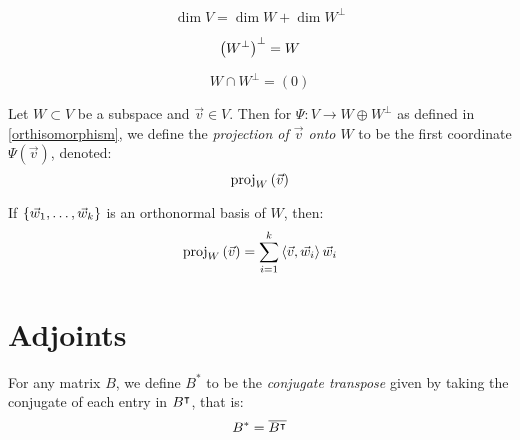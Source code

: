 \begin{corollary}
  $$\dim V = \dim W + \dim W^\perp$$
\end{corollary}

\begin{corollary}
  $$\paren{W^\perp}^\perp = W$$
\end{corollary}

\begin{corollary}
  $$W \cap W^\perp = (0)$$
\end{corollary}

\begin{definition}
  Let $W \subset V$ be a subspace and $\vec v \in V$. Then for $\Psi : V \to W \oplus W^\perp$ as defined in \ref{orthisomorphism},
  we define the \emph{projection of $\vec v$ onto $W$} to be the first coordinate $\Psi(\vec v)$, denoted:
    $$\proj[W]{\vec v}$$
\end{definition}

\begin{remark}
  If $\setof{\vec w_1, \ldots, \vec w_k}$ is an orthonormal basis of $W$, then:
    $$\proj[W]{\vec v} = \sum_{i=1}^k \inp{\vec v}{\vec w_i} \vec w_i$$
\end{remark}

\section{Adjoints}

\begin{definition}
  For any matrix $B$, we define $B^*$ to be the \emph{conjugate transpose} given by taking the conjugate of each entry in $\transpose{B}$, that is:
    $$B^* = \conj{\transpose{B}}$$
\end{definition}

